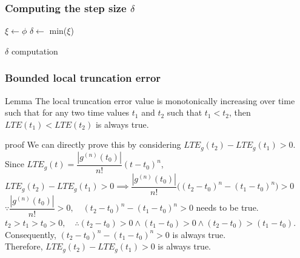 \begin{frame}[c] \frametitle{ Computing the step size $\delta$ }
	\begin{algorithm}[H]
	\SetAlgoLined
	$\xi \leftarrow \phi$\;
	$\delta \leftarrow $ min($\xi$)\;
	\caption{ $\delta$ computation }
	\end{algorithm}
\end{frame}

\begin{frame}[c] \frametitle{ Bounded local truncation error }
	\begin{block}{Lemma}
		The local truncation error value is monotonically increasing over time such that for any two time values $t_1$ and $t_2$ such that $t_1 < t_2$, then $LTE(t_1) < LTE(t_2)$ is always true.
	\end{block}
	\begin{block}{proof}
		We can directly prove this by considering $LTE_g(t_2) - LTE_g(t_1) > 0$. \\ 
		Since $LTE_g(t) = \dfrac{|g^{(n)}(t_0)|}{n!}(t-t_0)^n$, \\ 
		$LTE_g(t_2) - LTE_g(t_1) > 0 \implies \dfrac{|g^{(n)}(t_0)|}{n!} \bigg( (t_2-t_0)^n - (t_1-t_0)^n \bigg) > 0 $ \\
		$\because \dfrac{|g^{(n)}(t_0)|}{n!} > 0, \quad (t_2-t_0)^n - (t_1-t_0)^n > 0$ needs to be true. \\
		$t_2 > t_1 > t_0 > 0, \quad \therefore (t_2- t_0) > 0 \wedge (t_1 - t_0) > 0 \wedge (t_2- t_0) > (t_1- t_0)$. \\
		Consequently, $(t_2-t_0)^n - (t_1-t_0)^n > 0$ is always true. \\
		Therefore, $LTE_g(t_2) - LTE_g(t_1) > 0$ is always true.
	\end{block}
	
\end{frame}

